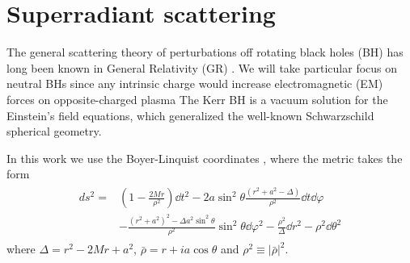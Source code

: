 
\section{Superradiant scattering}
\label{Section2}

The general scattering theory of perturbations off rotating black holes (BH) has long been known in General Relativity (GR) \cite{Futterman1988}.
We will take particular focus on neutral BHs since any intrinsic charge would increase electromagnetic (EM) forces on opposite-charged  plasma 
The Kerr BH is a vacuum solution for the Einstein's field equations, which generalized the well-known Schwarzschild spherical geometry.

In this work we use the Boyer-Linquist coordinates \cite{Boyer1967}, where the metric takes the form
\begin{align}
\begin{split}
    ds^2 =& \left(1 - \frac{2 M r}{\rho^2} \right) \dd t^2 - 2 a \sin^2\theta \frac{(r^2+a^2-\Delta)}{\rho^2} \dd t \dd \varphi \\
    &- \frac{(r^2+a^2)^2- \Delta a^2 \sin^2\theta }{\rho^2} \sin^2\theta \dd\varphi^2 - \frac{\rho^2}{\Delta} \dd r^2 - \rho^2 \dd \theta^2
\end{split}
\end{align}
where $\Delta=r^2-2 M r +a^2$, $\bar{\rho} = r + i a \cos\theta$ and $\rho^2 \equiv |\bar{\rho}|^2$.

